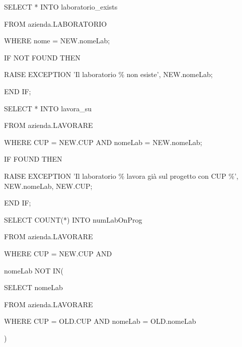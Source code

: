 \begin{flushleft}
\begin{description}
\begin{description}
                    \vspace{0.5cm}

                    \item SELECT * INTO laboratorio\_exists
                    \item FROM azienda.LABORATORIO
                    \item WHERE nome = NEW.nomeLab;
                
                    \vspace{0.5cm}

                    \item IF NOT FOUND THEN
                    \begin{description}
                        \item RAISE EXCEPTION 'Il laboratorio \% non esiste', NEW.nomeLab;
                    \end{description}
                    \item END IF;
                    
                    \vspace{0.5cm}
                
                    \item SELECT * INTO lavora\_su
                    \item FROM azienda.LAVORARE
                    \item WHERE CUP = NEW.CUP AND nomeLab = NEW.nomeLab;
                
                    \vspace{0.5cm}

                    \item IF FOUND THEN
                    \begin{description}
                        \item RAISE EXCEPTION 'Il laboratorio \% lavora già sul progetto con CUP \%', NEW.nomeLab, NEW.CUP;
                    \end{description}
                    \item END IF;

                    \vspace{0.5cm}

                    \item SELECT COUNT(*) INTO numLabOnProg
                    \item FROM azienda.LAVORARE
                    \item WHERE CUP = NEW.CUP AND
                    \item nomeLab NOT IN(
                    \begin{description}
                        \item SELECT nomeLab
                        \item FROM azienda.LAVORARE
                        \item WHERE CUP = OLD.CUP AND nomeLab = OLD.nomeLab
                    \end{description}
                    \item )


\end{description}
\end{description}
\end{flushleft}
